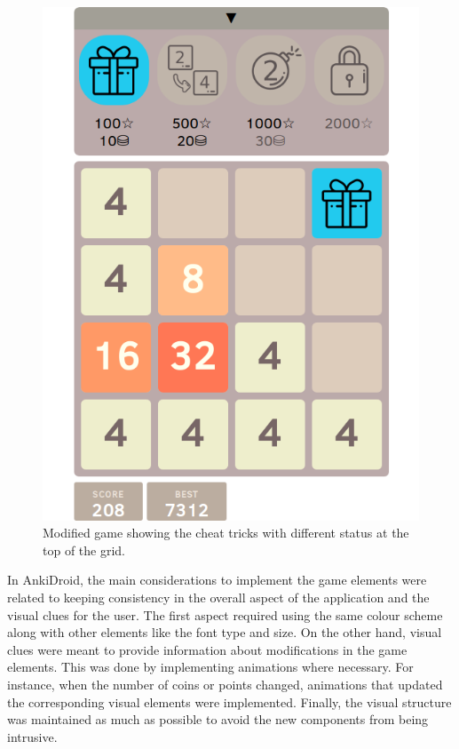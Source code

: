 \begin{figure}[htb]
    \vskip 5mm
        \begin{center}
            \includegraphics[scale=0.4]{./Figures/modified_game.png}
            \caption{Modified game showing the cheat tricks with different status at the top of the grid.}
            \label{fig:modified-game}
        \end{center}
    \vskip -5mm
\end{figure}

In AnkiDroid, the main considerations to implement the game elements were related to keeping consistency in the overall aspect of the application and the visual clues for the user. The first aspect required using the same colour scheme along with other elements like the font type and size. On the other hand, visual clues were meant to provide information about modifications in the game elements. This was done by implementing animations where necessary. For instance, when the number of coins or points changed, animations that updated the corresponding visual elements were implemented. Finally, the visual structure was maintained as much as possible to avoid the new components from being intrusive.







